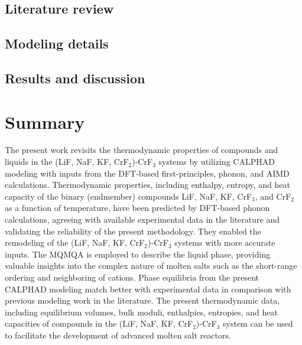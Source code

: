 \subsection{Literature review} \label{moltensalts:ssec:LaCl3lit}


\subsection{Modeling details} \label{moltensalts:ssec:LaCl3model}


    \subsection{Results and discussion} \label{moltensalts:ssec:LaCl3result}


\section{Summary} \label{moltensalts:sec:Summary}
The present work revisits the thermodynamic properties of compounds and liquids in the (LiF, NaF, KF, CrF$_2$)-CrF$_3$ systems by utilizing CALPHAD modeling with inputs from the DFT-based first-principles, phonon, and AIMD calculations. Thermodynamic properties, including enthalpy, entropy, and heat capacity of the binary (endmember) compounds LiF, NaF, KF, CrF$_3$, and CrF$_2$ as a function of temperature, have been predicted by DFT-based phonon calculations, agreeing with available experimental data in the literature and validating the reliability of the present methodology. They enabled the remodeling of the (LiF, NaF, KF, CrF$_2$)-CrF$_3$ systems with more accurate inputs. The MQMQA is employed to describe the liquid phase, providing valuable insights into the complex nature of molten salts such as the short-range ordering and neighboring of cations. Phase equilibria from the present CALPHAD modeling match better with experimental data in comparison with previous modeling work in the literature. The present thermodynamic data, including equilibrium volumes, bulk moduli, enthalpies, entropies, and heat capacities of compounds in the (LiF, NaF, KF, CrF$_2$)-CrF$_3$ system can be used to facilitate the development of advanced molten salt reactors.